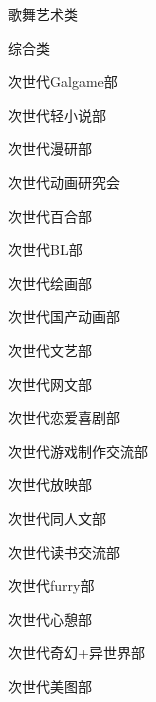 \begin{multicols}{3}
\begin{categorysection}{歌舞艺术类}
    \end{categorysection}
    
    \begin{categorysection}{综合类}
        \item 次世代Galgame部
        \item 次世代轻小说部
        \item 次世代漫研部
        \item 次世代动画研究会
        \item 次世代百合部
        \item 次世代BL部
        \item 次世代绘画部
        \item 次世代国产动画部
        \item 次世代文艺部
        \item 次世代网文部
        \item 次世代恋爱喜剧部
        \item 次世代游戏制作交流部
        \item 次世代放映部
        \item 次世代同人文部
        \item 次世代读书交流部
        \item 次世代furry部
        \item 次世代心憩部
        \item 次世代奇幻+异世界部
        \item 次世代美图部
    \end{categorysection}


\end{multicols}
